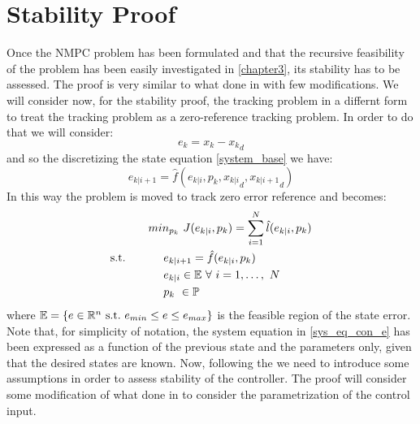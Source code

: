 

\section{Stability Proof}\label{stabproof}

Once the NMPC problem has been formulated and that the recursive feasibility of the problem has been easily investigated in \ref{chapter3}, its stability has to be assessed. 
The proof is very similar to what done in \cite{alamir2018stability} with few modifications. We will consider now, for the stability proof, the tracking problem in a differnt form to treat the tracking problem as a zero-reference tracking problem. In order to do that we will consider:
\begin{equation*}
    e_k=x_k-{x_k}_d
\end{equation*}
and so the discretizing the state equation \ref{system_base} we have:
\begin{equation}\label{sys_eq_con_e}
    e_{k|i+1}=\hat{f}(e_{k|i},p_k,{x_{k|i}}_d,{x_{k|i+1}}_d)
\end{equation}
In this way the problem is moved to track zero error reference and becomes: 
\begin{equation} \label{ourproblem_stab}
\begin{split}
		& min_{{p}_k}\ J({e}_{k|i},{p}_k) =\sum_{i=1}^{N}\hat{l}(e_{k|i},{p}_{k}) \\
		\textnormal{s.t.}\qquad
		&\ \ \ \ e_{k|i+1}=\hat{f}(e_{k|i},p_k) \\
		&\ \ \ \ e_{k|i} \in \mathbb{E}\ \forall\ i=1,\dots,\ N  \\
		&\ \ \ \ {p}_k\   \in \mathbb{P}\ \\
	\end{split}	
\end{equation}
where $\mathbb{E} = \lbrace {e}\in \mathbb{R}^n\ \textnormal{s.t.}\ {e}_{min}\leq e\leq e_{max} \rbrace$ is the feasible region of the state error. Note that, for simplicity of notation, the system equation in \ref{sys_eq_con_e} has been expressed as a function of the previous state and the parameters only, given that the desired states are known.
Now, following the \cite{alamir2018stability} we need to introduce some assumptions in order to assess stability of the controller. The proof will consider some modification of what done in \cite{alamir2018stability} to consider the parametrization of the control input. 



